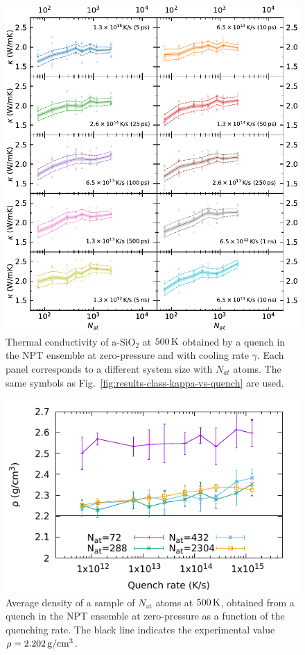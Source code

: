 \begin{figure}[!htb]
    \centering
    \includegraphics[width=\textwidth]{chapters/appendix/figures/Silica_NPT_kappa_NATconv_tesi.pdf}
    \caption{Thermal conductivity of a-SiO$_2$ at $500\,\mathrm{K}$ obtained by a quench in the NPT ensemble at zero-pressure and with cooling rate $\gamma$. 
    Each panel corresponds to a different system size with $N_{at}$ atoms.
    The same symbols as Fig.~\ref{fig:results-class-kappa-vs-quench} are used.
    }
    \label{fig:appendix-silica-class-npt-kappa-vs-quench}
\end{figure}

\begin{figure}[!htb]
    \centering
    \includegraphics[width=12cm]{chapters/appendix/figures/dens_NPT_quench.pdf}
    \caption{Average density of a sample of $N_\mathrm{at}$ atoms at $500\,\mathrm{K}$, obtained from a quench in the NPT ensemble at zero-pressure as a function of the quenching rate. The black line indicates the experimental value $\rho=2.202\,\mathrm{g/cm^3}$. }
    \label{fig:appendix-silica-class-npt-density-vs-quench}
\end{figure}